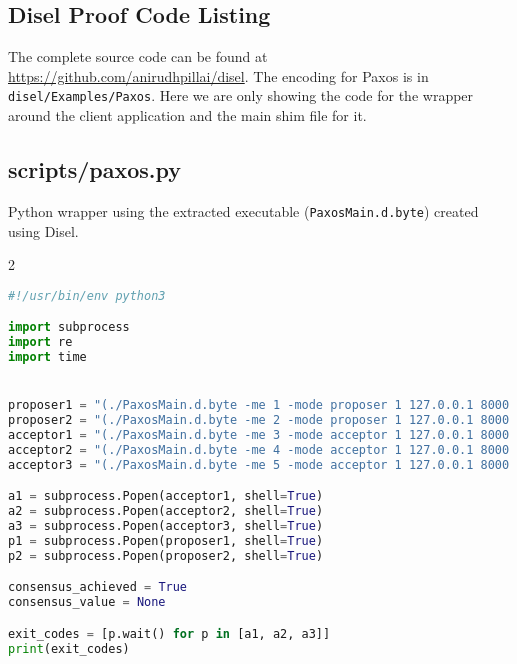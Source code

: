 \begin{landscape}

\chapter{Disel Proof Code Listing}

The complete source code can be found at
\href{https://github.com/anirudhpillai/disel}{https://github.com/anirudhpillai/disel}.
The encoding for Paxos is in \texttt{disel/Examples/Paxos}. Here we are only
showing the code for the wrapper around the client application and the main
shim file for it.

\section{scripts/paxos.py}
Python wrapper using the extracted executable (\texttt{PaxosMain.d.byte}) created using Disel.

\begin{multicols*}{2}
\begin{lstlisting}[style=SourceCodeListing, language=Python]
#!/usr/bin/env python3

import subprocess
import re
import time


proposer1 = "(./PaxosMain.d.byte -me 1 -mode proposer 1 127.0.0.1 8000 2 127.0.0.1 8001 3 127.0.0.1 8002 4 127.0.0.1 8003 5 127.0.0.1 8004 &) > proposer1.log 2>&1"
proposer2 = "(./PaxosMain.d.byte -me 2 -mode proposer 1 127.0.0.1 8000 2 127.0.0.1 8001 3 127.0.0.1 8002 4 127.0.0.1 8003 5 127.0.0.1 8004 &) > proposer2.log 2>&1"
acceptor1 = "(./PaxosMain.d.byte -me 3 -mode acceptor 1 127.0.0.1 8000 2 127.0.0.1 8001 3 127.0.0.1 8002 4 127.0.0.1 8003 5 127.0.0.1 8004 &) > acceptor1.log 2>&1"
acceptor2 = "(./PaxosMain.d.byte -me 4 -mode acceptor 1 127.0.0.1 8000 2 127.0.0.1 8001 3 127.0.0.1 8002 4 127.0.0.1 8003 5 127.0.0.1 8004 &) > acceptor2.log 2>&1"
acceptor3 = "(./PaxosMain.d.byte -me 5 -mode acceptor 1 127.0.0.1 8000 2 127.0.0.1 8001 3 127.0.0.1 8002 4 127.0.0.1 8003 5 127.0.0.1 8004 &) > acceptor3.log 2>&1"

a1 = subprocess.Popen(acceptor1, shell=True)
a2 = subprocess.Popen(acceptor2, shell=True)
a3 = subprocess.Popen(acceptor3, shell=True)
p1 = subprocess.Popen(proposer1, shell=True)
p2 = subprocess.Popen(proposer2, shell=True)

consensus_achieved = True
consensus_value = None

exit_codes = [p.wait() for p in [a1, a2, a3]]
print(exit_codes)


\end{lstlisting}
\end{multicols*}
\end{landscape}
